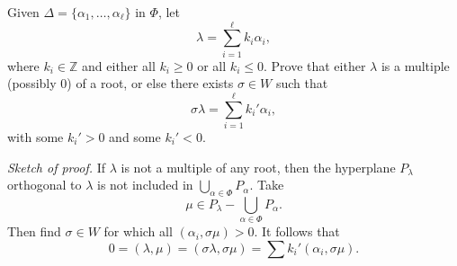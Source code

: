 \begin{exercise}
    [P54, Ex10] Given \(\Delta=\{\alpha_1,\ldots,\alpha_\ell\}\) in \(\Phi\), let
    \[
        \lambda=\sum_{i=1}^{\ell} k_i\alpha_i,
    \]
    where \(k_i\in\mathbb{Z}\) and either all \(k_i\geq 0\) or all \(k_i\leq 0\). Prove that either \(\lambda\) is a multiple (possibly \(0\)) of a root, or else there exists \(\sigma\in W\) such that
    \[
        \sigma\lambda=\sum_{i=1}^{\ell} k_i'\alpha_i,
    \]
    with some \(k_i'>0\) and some \(k_i'<0\).

    \emph{Sketch of proof.} If \(\lambda\) is not a multiple of any root, then the hyperplane \(P_\lambda\) orthogonal to \(\lambda\) is not included in \(\bigcup_{\alpha\in\Phi}P_\alpha\). Take
    \[
        \mu\in P_\lambda-\bigcup_{\alpha\in\Phi}P_\alpha.
    \]
    Then find \(\sigma\in W\) for which all \((\alpha_i,\sigma\mu)>0\). It follows that
    \[
        0=(\lambda,\mu)=(\sigma\lambda,\sigma\mu)
        =\sum k_i'(\alpha_i,\sigma\mu).
    \]
\end{exercise}

